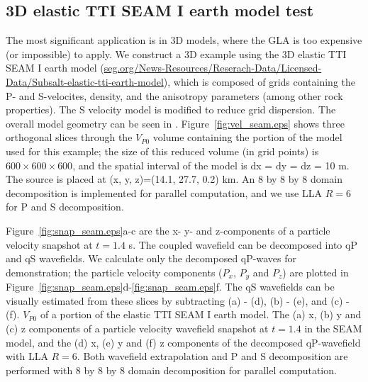 \documentclass[manuscript,ulem,graphix,revised]{geophysics}
\begin{document}
\subsection{3D elastic TTI SEAM I earth model test}
\indent\indent
The most significant application is in 3D models, where the GLA is too expensive (or impossible) to apply. We construct a 3D example using the 3D elastic TTI SEAM I earth model    (\url{seg.org/News-Resources/Reserach-Data/Licensed-Data/Subsalt-elastic-tti-earth-model}), which is composed of grids containing the P- and S-velocites, density, and the anisotropy parameters (among other rock properties). The S velocity model is modified to reduce grid dispersion. The overall model geometry can be seen in \citet{fehler11}. Figure~\ref{fig:vel_seam.eps} shows three orthogonal slices through the $V_{P0}$ volume containing the portion of the model used for this example; the size of this reduced volume (in grid points) is $600\times 600 \times 600$, and the spatial interval of the model is dx = dy = dz = 10 m. The source is placed at (x, y, z)=(14.1, 27.7, 0.2) km. An 8 by 8 by 8 domain decomposition is implemented for parallel computation, and we use LLA $R=6$ for P and S decomposition. 

Figure~\ref{fig:snap_seam.eps}a-c are  the x- y- and z-components of a particle velocity snapshot at $t=1.4$ s. The coupled wavefield can be decomposed into qP and qS wavefields. We calculate only the decomposed qP-waves for demonstration; the particle velocity components ($P_x$, $P_y$ and $P_z$) are plotted in Figure~\ref{fig:snap_seam.eps}d-\ref{fig:snap_seam.eps}f. The qS wavefields can be visually estimated from these slices by subtracting (a) - (d), (b) - (e), and (c) - (f).  
{
$V_{P0}$ of a portion of the elastic TTI SEAM I earth model.
}
{
The (a) x, (b) y and (c) z components of a particle velocity wavefield snapshot at $t=1.4$ in the SEAM model, and the (d) x, (e) y and (f) z components of the decomposed qP-wavefield with LLA $R=6$. Both wavefield extrapolation and P and S decomposition are performed with 8 by 8 by 8 domain decomposition for parallel computation.
}


\end{document}
